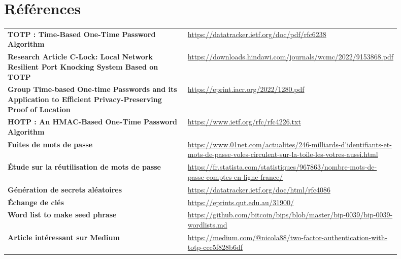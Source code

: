 \documentclass[a4paper, 10pt]{article}
\newcommand{\totp}{\textsc{TOTP} }
\newcommand{\hotp}{\textsc{HOTP} }
\begin{document}
\section{Références}

\renewcommand{\arraystretch}{2.5}

\begin{tabular}{p{0.5\linewidth}p{0.4\linewidth}}
   \textbf{\totp: Time-Based One-Time Password Algorithm} & \url{https://datatracker.ietf.org/doc/pdf/rfc6238} \\
   
   \textbf{Research Article C-Lock: Local Network Resilient Port Knocking System Based on TOTP} & \url{https://downloads.hindawi.com/journals/wcmc/2022/9153868.pdf} \\
   
   \textbf{Group Time-based One-time Passwords and its Application to Efficient Privacy-Preserving Proof of Location} & \url{https://eprint.iacr.org/2022/1280.pdf} \\
   
   \textbf{\hotp: An HMAC-Based One-Time Password Algorithm} & \url{https://www.ietf.org/rfc/rfc4226.txt} \\
   
   \textbf{Fuites de mots de passe} & \url{https://www.01net.com/actualites/246-milliards-d'identifiants-et-mots-de-passe-voles-circulent-sur-la-toile-les-votres-aussi.html} \\
   
   \textbf{Étude sur la réutilisation de mots de passe} & \url{https://fr.statista.com/statistiques/967863/nombre-mots-de-passe-comptes-en-ligne-france/} \\
   
   \textbf{Génération de secrets aléatoires} & \url{https://datatracker.ietf.org/doc/html/rfc4086} \\
   
   \textbf{Échange de clés} & \url{https://eprints.qut.edu.au/31900/} \\
   
   \textbf{Word list to make seed phrase} & \url{https://github.com/bitcoin/bips/blob/master/bip-0039/bip-0039-wordlists.md} \\
   
   \textbf{Article intéressant sur Medium} & \url{https://medium.com/@nicola88/two-factor-authentication-with-totp-ccc5f828b6df} \\
   

\end{tabular}
\end{document}
